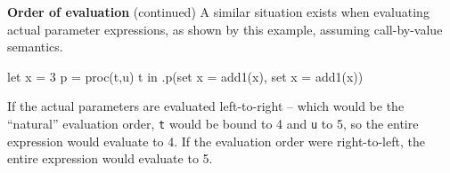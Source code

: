\begin{minipage}[t]{\sw}
\slidenumber
\LARGE
{\bf Order of evaluation} (continued)\exx
A similar situation exists
when evaluating actual parameter expressions,
as shown by this example, assuming call-by-value semantics.
\begin{qv}
let
  x = 3
  p = proc(t,u) t
in
  .p(set x = add1(x), set x = add1(x))
\end{qv}
If the actual parameters are evaluated left-to-right --
which would be the ``natural'' evaluation order,
\verb't' would be bound to 4 and \verb'u' to 5,
so the entire expression would evaluate to 4.
If the evaluation order were right-to-left,
the entire expression would evaluate to 5.\exx
\end{minipage}
